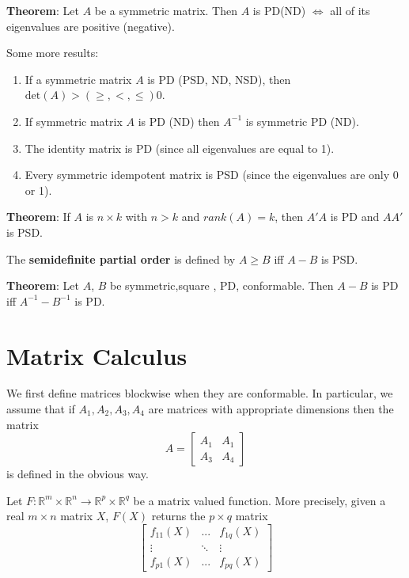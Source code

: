 \documentclass[12pt,]{book}
\providecommand{\tightlist}{%
  \setlength{\itemsep}{0pt}\setlength{\parskip}{0pt}}
\begin{document}
\textbf{Theorem}:
Let \(A\) be a symmetric matrix. Then \(A\) is PD(ND) \(\iff\) all of its eigenvalues are positive (negative).

Some more results:

\begin{enumerate}
\def\labelenumi{\arabic{enumi}.}
\tightlist
\item
  If a symmetric matrix \(A\) is PD (PSD, ND, NSD), then \(\text{det}(A) >(\geq,<,\leq) 0\).
\item
  If symmetric matrix \(A\) is PD (ND) then \(A^{-1}\) is symmetric PD (ND).
\item
  The identity matrix is PD (since all eigenvalues are equal to 1).
\item
  Every symmetric idempotent matrix is PSD (since the eigenvalues are only 0 or 1).
\end{enumerate}

\textbf{Theorem}:
If \(A\) is \(n\times k\) with \(n>k\) and \(rank(A)=k\), then \(A'A\) is PD and \(AA'\) is PSD.

The \textbf{semidefinite partial order} is defined by \(A \geq B\) iff \(A-B\) is PSD.

\textbf{Theorem}:
Let \(A\), \(B\) be symmetric,square , PD, conformable. Then \(A-B\) is PD iff \(A^{-1}-B^{-1}\) is PD.

\hypertarget{matrix-calculus}{%
\section{Matrix Calculus}\label{matrix-calculus}}

We first define matrices blockwise when they are conformable. In particular, we assume that if \(A_1, A_2, A_3, A_4\) are matrices with appropriate dimensions then the matrix
\[
    A = \begin{bmatrix} A_1 & A_1 \\
    A_3 & A_4 \end{bmatrix}
\]
is defined in the obvious way.

Let \(F: \mathbb R^m \times \mathbb R^n \rightarrow \mathbb R^p \times \mathbb R^q\) be a matrix valued function. More precisely, given a real \(m \times n\) matrix \(X\), \(F(X)\) returns the \(p \times q\) matrix\\
\[
    \begin{bmatrix}
    f_ {11}(X) & ... & f_ {1q}(X) \\ \vdots & \ddots & \vdots \\
    f_ {p1}(X)& ... & f_ {pq}(X)
    \end{bmatrix}
\]
\end{document}
